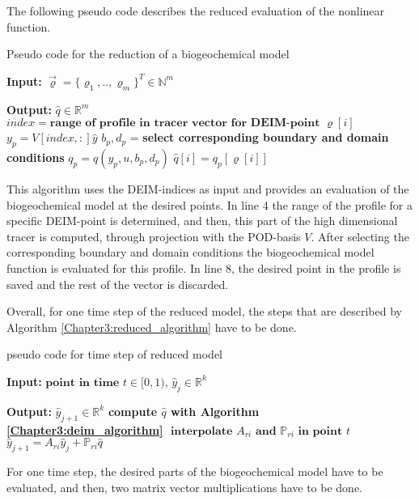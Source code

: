 The following pseudo code describes the reduced evaluation of the nonlinear function.
\begin{algorithm}
\caption{Pseudo code for the reduction of a biogeochemical model}\label{Chapter3:deim_algorithm}
\begin{algorithmic}[1]
   \item \textbf{Input: }{$\vec{\varrho} = \{\varrho_1,..,\varrho_m\}^T \in \mathbb{N}^m$}
   \item \textbf{Output: }{$\hat{q} \in \mathbb{R}^m$} 
      \State $index = \textbf{range of profile in tracer vector for DEIM-point } \varrho[i]$ 
      \State $y_p = V[index,:] \hat{y}$ 
      \State $b_p,d_p$ = \textbf{select corresponding boundary and domain conditions}
      \State $q_p = q(y_p,u,b_p,d_p)$
      \State $\hat{q}[i] = q_p[\varrho [i]]$ 
    \EndFor
\end{algorithmic}
\end{algorithm}

This algorithm uses the DEIM-indices as input and provides an evaluation of the biogeochemical model at the desired points.
In line 4 the range of the profile for a specific DEIM-point is determined, and then, this part of the high dimensional tracer
is computed, through projection with the POD-basis $V$. After selecting the corresponding boundary and domain conditions
the biogeochemical model function is evaluated for this profile. In line 8, the desired point in the profile is
saved and the rest of the vector is discarded. 


Overall, for one time step of the reduced model, the steps that are described by Algorithm \ref{Chapter3:reduced_algorithm} have to be done.
\begin{algorithm}
\caption{pseudo code for time step of reduced model}\label{Chapter3:reduced_algorithm}
\begin{algorithmic}[1]
  \item \textbf{Input: } {$\textbf{point in time } t \in [0,1)$, $\hat{y}_j \in \mathbb{R}^k$}
 \item \textbf{Output: } {$\hat{y}_{j+1} \in \mathbb{R}^k $}
 \State \textbf{compute $\hat{q}$ with Algorithm \ref{Chapter3:deim_algorithm}}
 \State $\textbf{ interpolate } A_{ri} \textbf{ and } \mathbb{P}_{ri} \textbf{ in point } t$
 \State $\hat{y}_{j+1} = A_{ri}\hat{y}_j + \mathbb{P}_{ri} \hat{q}$ 
\end{algorithmic}
\end{algorithm}

For one time step, the desired parts of the biogeochemical model have to be evaluated, and then, two matrix
vector multiplications have to be done. 



